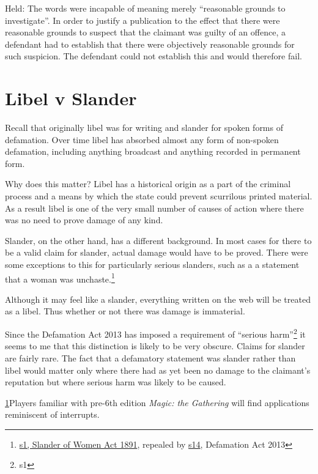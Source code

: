 \documentclass[]{article}
\begin{document}
Held: The words were incapable of meaning merely ``reasonable grounds to
investigate''. In order to justify a publication to the effect that
there were reasonable grounds to suspect that the claimant was guilty of
an offence, a defendant had to establish that there were objectively
reasonable grounds for such suspicion. The defendant could not establish
this and would therefore fail.

\section{Libel v Slander}
\label{sec:app-libelvslander}

Recall that originally libel was for writing and slander for spoken forms of defamation. Over time libel has absorbed almost any form of non-spoken defamation, including anything broadcast and anything recorded in permanent form.

Why does this matter? Libel has a historical origin as a part of the
criminal process and a means by which the state could prevent scurrilous
printed material. As a result libel is one of the very small number of
causes of action where there was no need to prove damage of any kind.

Slander, on the other hand, has a different background. In most cases
for there to be a valid claim for slander, actual damage would have to
be proved. There were some exceptions to this for particularly serious
slanders, such as a a statement that a woman was unchaste.\footnote{\href{http://www.legislation.gov.uk/ukpga/Vict/54-55/51/section/1}{s1, Slander of Women Act 1891}, repealed by \href{http://www.legislation.gov.uk/ukpga/2013/26/section/14/enacted}{s14}, Defamation Act 2013}

Although it may feel like a slander, everything written on the web will
be treated as a libel. Thus whether or not there was damage is
immaterial.

Since the Defamation Act 2013 has imposed a requirement of ``serious harm''\footnote{s1} it seems to me that this distinction is likely to be very obscure. Claims for slander are fairly rare. The fact that a defamatory statement was slander rather than libel would matter only where there had as yet been no damage to the claimant's reputation but where serious harm was likely to be caused.


\hyperref[sdfootnote1anc]{1}Players familiar with pre-6th edition
\emph{Magic: the Gathering} will find applications reminiscent of
interrupts.
\end{document}
